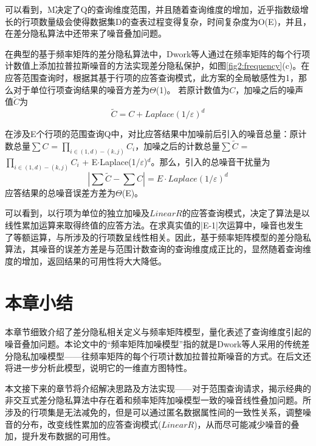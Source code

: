可以看到，M决定了Q的查询维度范围，并且随着查询维度的增加，近乎指数级增长的行项数量级会使得数据集D的查表过程变得复杂，时间复杂度为O(E)，并且，在差分隐私算法中还带来了噪音叠加问题。

在典型的基于频率矩阵的差分隐私算法中，Dwork等人\supercite{Dwork-Calibrating}通过在频率矩阵的每个行项计数值上添加拉普拉斯噪音的方法实现差分隐私保护，如图\ref{fig2:frequency}(c)。在应答范围查询时，根据其基于行项的应答查询模式，此方案的全局敏感性为1，那么对于单位行项查询结果的噪音方差为$\Theta$(1)。
若原计数值为$C$，加噪之后的噪声值$\tilde{C}$为
\[
\tilde{C} = C + Laplace(1/\varepsilon)^d
\]

在涉及E个行项的范围查询Q中，对比应答结果中加噪前后引入的噪音总量：原计数总量$\sum{C}$ = \(\prod\nolimits_{i \in (1,d) - (k,j)} {C{_i}} \)，加噪之后的计数总量$\sum{\tilde{C}}$ = \(\prod\nolimits_{i \in (1,d) - (k,j)} {C{_i}} \) + E$\cdotp$Laplace(1/$\varepsilon$)$^d$。那么，引入的总噪音干扰量为
\[
|\sum{\tilde{C}} - \sum{C}| = E \cdotp Laplace(1/\varepsilon)^d
\]
应答结果的总噪音误差方差为$\Theta$(E)。

可以看到，以行项为单位的独立加噪及$LinearR$的应答查询模式，决定了算法是以线性累加运算来取得终值的应答方法。在求真实值的|E-1|次运算中，噪音也发生了等额运算，与所涉及的行项数呈线性相关。因此，基于频率矩阵模型的差分隐私算法，其噪音的误差方差是与范围计数查询的查询维度成正比的，显然随着查询维度的增加，返回结果的可用性将大大降低。

\section{本章小结}

本章节细致介绍了差分隐私相关定义与频率矩阵模型，量化表述了查询维度引起的噪音叠加问题。本论文中的“频率矩阵加噪模型”指的就是Dwork等人采用的传统差分隐私加噪模型——往频率矩阵的每个行项计数加拉普拉斯噪音的方式。在后文还将进一步分析此模型，说明它的一维直方图特性。

本文接下来的章节将介绍解决思路及方法实现——对于范围查询请求，揭示经典的非交互式差分隐私算法中存在着和频率矩阵加噪模型一致的噪音线性叠加问题。所涉及的行项集是无法减免的，但是可以通过匿名数据属性间的一致性关系，调整噪音的分布，改变线性累加的应答查询模式($LinearR$)，从而尽可能减少噪音的叠加，提升发布数据的可用性。


